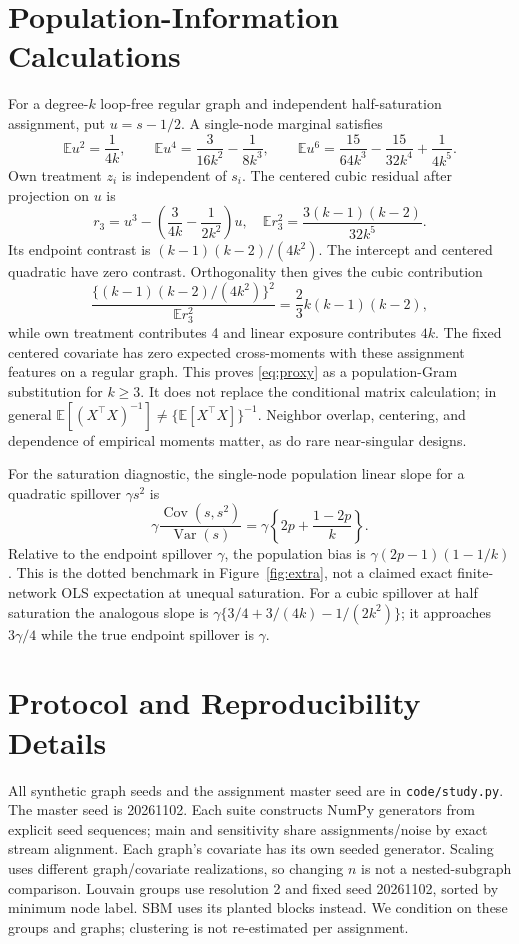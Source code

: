 \documentclass{article}
\newcommand{\E}{\mathbb E}
\begin{document}
\section{Population-Information Calculations}\label{app:proxy}
For a degree-$k$ loop-free regular graph and independent half-saturation assignment, put $u=s-1/2$. A single-node marginal satisfies
\[
\E u^2=\frac1{4k},\qquad
\E u^4=\frac3{16k^2}-\frac1{8k^3},\qquad
\E u^6=\frac{15}{64k^3}-\frac{15}{32k^4}+\frac1{4k^5}.
\]
Own treatment $z_i$ is independent of $s_i$. The centered cubic residual after projection on $u$ is
\[
r_3=u^3-\left(\frac3{4k}-\frac1{2k^2}\right)u,
\quad \E r_3^2=\frac{3(k-1)(k-2)}{32k^5}.
\]
Its endpoint contrast is $(k-1)(k-2)/(4k^2)$. The intercept and centered quadratic have zero contrast. Orthogonality then gives the cubic contribution
\[
\frac{\{(k-1)(k-2)/(4k^2)\}^2}{\E r_3^2}
=\frac23 k(k-1)(k-2),
\]
while own treatment contributes 4 and linear exposure contributes $4k$. The fixed centered covariate has zero expected cross-moments with these assignment features on a regular graph. This proves \eqref{eq:proxy} as a population-Gram substitution for $k\ge3$.
It does not replace the conditional matrix calculation; in general $\E[(X^\top X)^{-1}]\ne\{\E[X^\top X]\}^{-1}$. Neighbor overlap, centering, and dependence of empirical moments matter, as do rare near-singular designs.

For the saturation diagnostic, the single-node population linear slope for a quadratic spillover $\gamma s^2$ is
\[
\gamma\frac{\operatorname{Cov}(s,s^2)}{\operatorname{Var}(s)}
=\gamma\left\{2p+\frac{1-2p}{k}\right\}.
\]
Relative to the endpoint spillover $\gamma$, the population bias is $\gamma(2p-1)(1-1/k)$. This is the dotted benchmark in Figure~\ref{fig:extra}, not a claimed exact finite-network OLS expectation at unequal saturation.
For a cubic spillover at half saturation the analogous slope is
$\gamma\{3/4+3/(4k)-1/(2k^2)\}$; it approaches $3\gamma/4$ while the true endpoint spillover is $\gamma$.

\section{Protocol and Reproducibility Details}\label{app:protocol}
\begin{table}[h]
\centering\small
\caption{Measured statistics of the fixed primary graphs. Within is the fraction of directed edge incidences with endpoints in the same assignment/noise group; for these undirected graphs it equals the undirected within-edge fraction.}

\end{table}
All synthetic graph seeds and the assignment master seed are in \texttt{code/study.py}. The master seed is 20261102. Each suite constructs NumPy generators from explicit seed sequences; main and sensitivity share assignments/noise by exact stream alignment. Each graph's covariate has its own seeded generator. Scaling uses different graph/covariate realizations, so changing $n$ is not a nested-subgraph comparison. Louvain groups use resolution 2 and fixed seed 20261102, sorted by minimum node label. SBM uses its planted blocks instead. We condition on these groups and graphs; clustering is not re-estimated per assignment.
\end{document}
